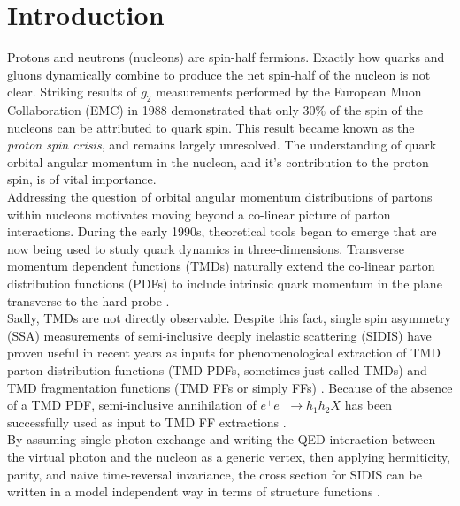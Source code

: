 \chapter{Introduction}

Protons and neutrons (nucleons) are spin-half fermions.  Exactly how quarks and gluons dynamically combine to produce the net spin-half of the nucleon is not clear.  Striking results of $g_2$ measurements performed by the European Muon Collaboration (EMC) in 1988 \cite{pdfs-leader:1988} demonstrated that only $30\%$ of the spin of the nucleons can be attributed to quark spin.  This result became known as the \textit{proton spin crisis}, and remains largely unresolved.  The understanding of quark orbital angular momentum in the nucleon, and it's contribution to the proton spin, is of vital importance.  \\

Addressing the question of orbital angular momentum distributions of partons within nucleons motivates moving beyond a co-linear picture of parton interactions.   During the early 1990s, theoretical tools began to emerge that are now being used to study quark dynamics in three-dimensions.  Transverse momentum dependent functions (TMDs) naturally extend the co-linear parton distribution functions (PDFs) to include intrinsic quark momentum in the plane transverse to the hard probe \cite{tmds-mulders:1995, tmds-bacchetta:2006}.  \\

Sadly, TMDs are not directly observable.  Despite this fact, single spin asymmetry (SSA) measurements of semi-inclusive deeply inelastic scattering (SIDIS) have proven useful in recent years as inputs for phenomenological extraction of TMD parton distribution functions (TMD PDFs, sometimes just called TMDs) and TMD fragmentation functions (TMD FFs or simply FFs) \cite{tmds-airapetian:2009, tmds-airapetian:2012, tmds-aghasyan:2017}.  Because of the absence of a TMD PDF, semi-inclusive annihilation of $e^+ e^- \rightarrow h_1 h_2 X$ has been successfully used as input to TMD FF extractions \cite{tmds-anselmino:2015}.  \\

By assuming single photon exchange and writing the QED interaction between the virtual photon and the nucleon as a generic vertex, then applying hermiticity, parity, and naive time-reversal invariance, the cross section for SIDIS can be written in a model independent way in terms of structure functions \cite{tmds-mulders:1995, tmds-bacchetta:2006}.  

